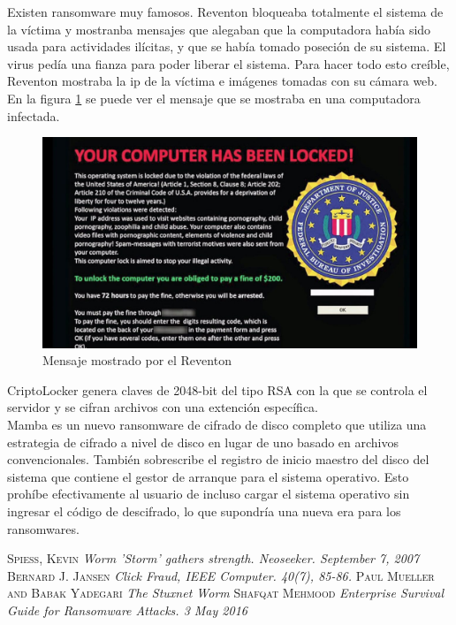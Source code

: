 \documentclass[a4paper,12pt]{article}
\begin{document}
Existen ransomware muy famosos. Reventon bloqueaba totalmente el sistema de la víctima y mostranba mensajes que alegaban que 
la computadora había sido usada para actividades ilícitas, y que se había tomado poseción de su sistema. El virus pedía una fianza
para poder liberar el sistema. Para hacer todo esto creíble, Reventon mostraba la ip de la víctima e imágenes tomadas con
su cámara web. En la figura \ref{fig:ran} se puede ver el mensaje que se mostraba en una computadora infectada. \\

\begin{figure}
 \centering
 \includegraphics[scale=0.3]{ran.png}
 \caption{Mensaje mostrado por el Reventon}
 \label{fig:ran}
\end{figure}


CriptoLocker genera claves de 2048-bit del tipo RSA con la que se controla el servidor y se cifran archivos con una extención
específica. \\
Mamba es un nuevo ransomware de cifrado de disco completo que utiliza una estrategia de cifrado a nivel de disco
en lugar de uno basado en archivos convencionales. También sobrescribe el registro de inicio maestro del disco del
sistema que contiene el gestor de arranque para el sistema operativo. Esto prohíbe efectivamente al usuario de incluso cargar
el sistema operativo sin ingresar el código de descifrado, lo que supondría una nueva era para los ransomwares.


\begin{thebibliography}{X}
   \textsc{Spiess, Kevin } \textit{Worm 'Storm' gathers strength. Neoseeker. September 7, 2007}  
   \textsc{Bernard J. Jansen} \textit{Click Fraud,  IEEE Computer. 40(7), 85-86.}
   \textsc{Paul Mueller and Babak Yadegari} \textit{The Stuxnet Worm}
   \textsc{Shafqat Mehmood} \textit{Enterprise Survival Guide for Ransomware Attacks. 3 May 2016}
\end{thebibliography}
\end{document}
